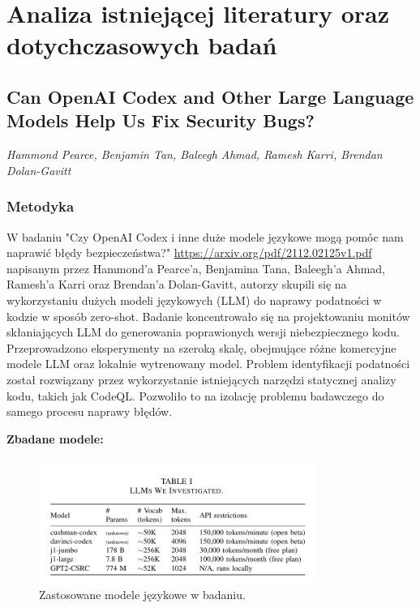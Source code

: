 
\chapter{Analiza istniejącej literatury oraz dotychczasowych badań}

\section{Can OpenAI Codex and Other Large Language Models Help Us Fix Security Bugs?} \footnotesize\textit{Hammond Pearce, Benjamin Tan, Baleegh Ahmad, Ramesh Karri, Brendan Dolan-Gavitt}

\normalsize
\subsection{Metodyka}
W badaniu "Czy OpenAI Codex i inne duże modele językowe mogą pomóc nam naprawić błędy bezpieczeństwa?"\cite{codex-fix-security-bugs} \url{https://arxiv.org/pdf/2112.02125v1.pdf} napisanym przez Hammond'a Pearce'a, Benjamina Tana, Baleegh'a Ahmad, Ramesh'a Karri oraz Brendan'a Dolan-Gavitt, autorzy skupili się na wykorzystaniu dużych modeli językowych (LLM) do naprawy podatności w kodzie w sposób zero-shot. Badanie koncentrowało się na projektowaniu monitów skłaniających LLM do generowania poprawionych wersji niebezpiecznego kodu. Przeprowadzono eksperymenty na szeroką skalę, obejmujące różne komercyjne modele LLM oraz lokalnie wytrenowany model. Problem identyfikacji podatności został rozwiązany przez wykorzystanie istniejących narzędzi statycznej analizy kodu, takich jak CodeQL. Pozwoliło to na izolację problemu badawczego do samego procesu naprawy błędów.

\textbf{Zbadane modele:}
\begin{figure}[H]
    \centering
    \includegraphics[width=0.8\textwidth]{img/codex-security-models.png}
    \caption{Zastosowane modele językowe w badaniu.}
    \label{fig:codex-fix-security-bugs-models}
\end{figure}

